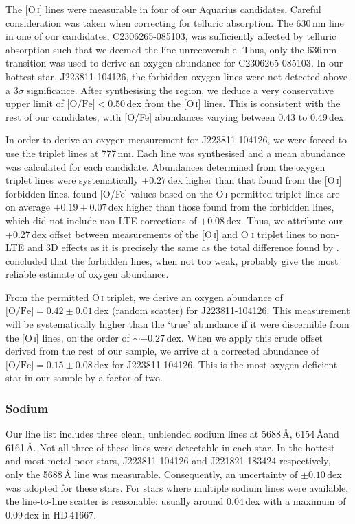 \documentclass{emulateapj}
\begin{document}
The {[O\,\textsc{i}]} lines were measurable in four of our Aquarius candidates. Careful consideration was taken when correcting for telluric absorption. The 630\,nm line in one of our candidates, {C2306265-085103}, was sufficiently affected by telluric absorption such that we deemed the line unrecoverable. Thus, only the 636\,nm transition was used to derive an oxygen abundance for {C2306265-085103}. In our hottest star, {J223811-104126}, the forbidden oxygen lines were not detected above a 3$\sigma$ significance. After synthesising the region, we deduce a very conservative upper limit of ${\mbox{[O/Fe]} < 0.50}$\,dex from the {[O\,\textsc{i}]} lines. This is consistent with the rest of our candidates, with [O/Fe] abundances varying between 0.43 to 0.49\,dex.

In order to derive an oxygen measurement for {J223811-104126}, we were forced to use the triplet lines at 777\,nm. Each line was synthesised and a mean abundance was calculated for each candidate. Abundances determined from the oxygen triplet lines were systematically $+0.27$\,dex higher than that found from the {[O\,\textsc{i}]} forbidden lines. \citet{perez;et-al_2006} found [O/Fe] values based on the {O\,\textsc{i}} permitted triplet lines are on average ${+0.19 \pm 0.07}$\,dex higher than those found from the forbidden lines, which did not include non-LTE corrections of $+$0.08\,dex. Thus, we  attribute our $+$0.27\,dex offset between measurements of the {[O\,\textsc{i}]} and {O \textsc{i}} triplet lines to non-LTE and 3D effects as it is precisely the same as the total difference found by \citet{perez;et-al_2006}. \citet{perez;et-al_2006} concluded that the forbidden lines, when not too weak, probably give the most reliable estimate of oxygen abundance.

From the permitted O\,\textsc{i} triplet, we derive an oxygen abundance of ${\mbox{[O/Fe]} = 0.42 \pm 0.01}$\,dex (random scatter) for {J223811-104126}. This measurement will be systematically higher than the `true' abundance if it were discernible from the [O\,\textsc{i}] lines, on the order of ${\sim}+0.27$\,dex. When we apply this crude offset derived from the rest of our sample, we arrive at a corrected abundance of ${\mbox{[O/Fe]} = 0.15 \pm 0.08}$\,dex for {J223811-104126}. This is the most oxygen-deficient star in our sample by a factor of two.


\subsubsection{Sodium}
\label{sec:sodium-abundances}
Our line list includes three clean, unblended sodium lines at 5688\,\AA, 6154\,\AA and 6161\,\AA. Not all three of these lines were detectable in each star. In the hottest and most metal-poor stars, J223811-104126 and J221821-183424 respectively, only the 5688\,{\AA} line was measurable. Consequently, an uncertainty of $\pm0.10$\,dex was adopted for these stars. For stars where multiple sodium lines were available, the line-to-line scatter is reasonable: usually around 0.04\,dex with a maximum of 0.09\,dex in HD\,41667.
\end{document}
